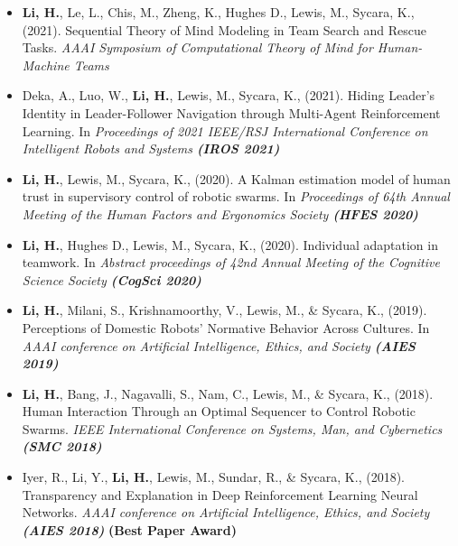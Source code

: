 \documentclass[10pt,letterpaper,roman]{moderncv}        %
\begin{document}
\begin{itemize}
\item{\textbf{Li, H.}, Le, L., Chis, M., Zheng, K., Hughes D., Lewis, M., Sycara, K., (2021). Sequential Theory of Mind Modeling in Team Search and Rescue Tasks. \textit{AAAI Symposium of Computational Theory of Mind for Human-Machine Teams}}

\item{Deka, A., Luo, W., \textbf{Li, H.}, Lewis, M., Sycara, K., (2021). Hiding Leader's Identity in Leader-Follower Navigation through Multi-Agent Reinforcement Learning. In \textit{Proceedings of 2021 IEEE/RSJ International Conference on Intelligent Robots and Systems \textbf{(IROS 2021)} }}

\item{\textbf{Li, H.}, Lewis, M., Sycara, K., (2020). A Kalman estimation model of human trust in supervisory control of robotic swarms. In \textit{Proceedings of 64th Annual Meeting of the Human Factors and Ergonomics Society \textbf{(HFES 2020)} }}

\item{\textbf{Li, H.}, Hughes D., Lewis, M., Sycara, K., (2020). Individual adaptation in teamwork. In \textit{Abstract proceedings of 42nd Annual Meeting of the Cognitive Science Society  \textbf{(CogSci 2020)} }}

\item{\textbf{Li, H.}, Milani, S., Krishnamoorthy, V., Lewis, M., \& Sycara, K., (2019). Perceptions of Domestic Robots' Normative Behavior Across Cultures. In \textit{AAAI conference on Artificial Intelligence, Ethics, and Society \textbf{(AIES 2019)}}}  


\item{\textbf{Li, H.}, Bang, J., Nagavalli, S., Nam, C., Lewis, M., \& Sycara, K., (2018). Human Interaction Through an Optimal Sequencer to Control Robotic Swarms. \textit{IEEE International Conference on Systems, Man, and Cybernetics \textbf{(SMC 2018)}}} 



\item{Iyer, R., Li, Y., \textbf{Li, H.}, Lewis, M., Sundar, R., \& Sycara, K., (2018). Transparency and Explanation in Deep Reinforcement Learning Neural Networks. \textit{AAAI conference on Artificial Intelligence, Ethics, and Society \textbf{(AIES 2018)}} \textbf{(Best Paper Award)}}




\end{itemize}



\end{document}
